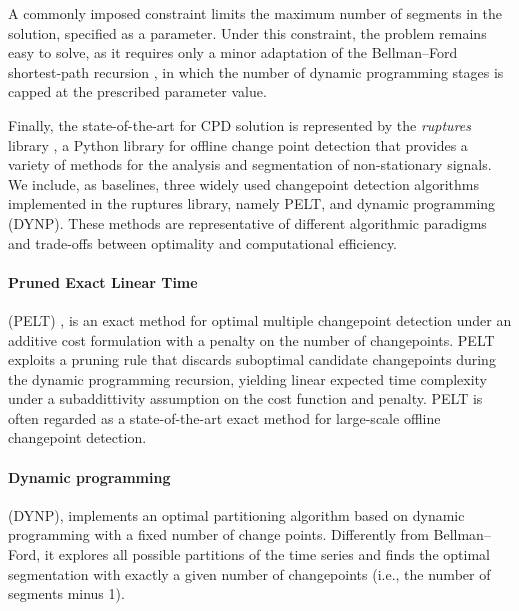 \documentclass[runningheads]{llncs}
\begin{document}
A commonly imposed constraint limits the maximum number of segments in the solution, specified as a parameter. Under this constraint, the problem remains easy to solve, as it requires only a minor adaptation of the Bellman–Ford shortest-path recursion \cite{CLRS09}, in which the number of dynamic programming stages is capped at the prescribed parameter value. 

Finally, the state-of-the-art for CPD solution is represented by the {\it ruptures} library \cite{TOV20}, a Python library for offline change point detection that provides a variety of methods for the analysis and segmentation of non-stationary signals. We include, as baselines, three widely used changepoint detection algorithms implemented in the ruptures library, namely PELT, and dynamic programming (DYNP). These methods are representative of different algorithmic paradigms and trade-offs between optimality and computational efficiency.

\paragraph{Pruned Exact Linear Time} (PELT) \cite{KFE12}, is an exact method for optimal multiple changepoint detection under an additive cost formulation with a penalty on the number of changepoints. PELT exploits a pruning rule that discards suboptimal candidate changepoints during the dynamic programming recursion, yielding linear expected time complexity under a subaddittivity assumption on the cost function and penalty. PELT is often regarded as a state-of-the-art exact method for large-scale offline changepoint detection.

\paragraph{Dynamic programming} (DYNP), implements an optimal partitioning algorithm based on dynamic programming with a fixed number of change points. Differently from Bellman–Ford, it explores all possible partitions of the time series and finds the optimal segmentation with exactly a given number of changepoints (i.e., the number of segments minus 1).

\end{document}
